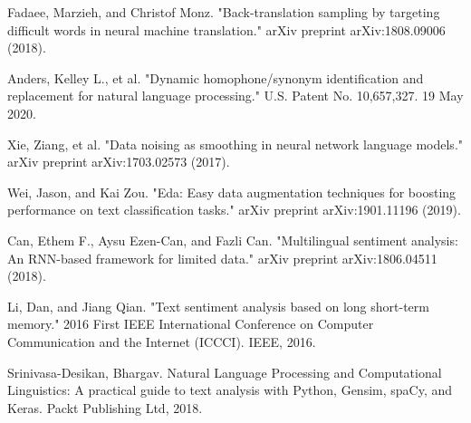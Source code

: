 \documentclass{article}
\begin{document}
\begin{thebibliography}{10}
 Fadaee, Marzieh, and Christof Monz. "Back-translation sampling by targeting difficult words in neural machine translation." arXiv preprint arXiv:1808.09006 (2018).

 Anders, Kelley L., et al. "Dynamic homophone/synonym identification and replacement for natural language processing." U.S. Patent No. 10,657,327. 19 May 2020.

 Xie, Ziang, et al. "Data noising as smoothing in neural network language models." arXiv preprint arXiv:1703.02573 (2017).

 Wei, Jason, and Kai Zou. "Eda: Easy data augmentation techniques for boosting performance on text classification tasks." arXiv preprint arXiv:1901.11196 (2019).

 Can, Ethem F., Aysu Ezen-Can, and Fazli Can. "Multilingual sentiment analysis: An RNN-based framework for limited data." arXiv preprint arXiv:1806.04511 (2018).

 Li, Dan, and Jiang Qian. "Text sentiment analysis based on long short-term memory." 2016 First IEEE International Conference on Computer Communication and the Internet (ICCCI). IEEE, 2016.

 Srinivasa-Desikan, Bhargav. Natural Language Processing and Computational Linguistics: A practical guide to text analysis with Python, Gensim, spaCy, and Keras. Packt Publishing Ltd, 2018.
\end{thebibliography}
\end{document}
